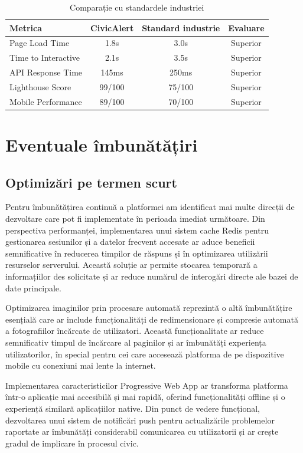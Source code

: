 \documentclass[12pt,a4paper]{report}
\begin{document}
\begin{table}[H]
\centering
\caption{Comparație cu standardele industriei}
\label{tab:industry_benchmark}
\begin{tabular}{|l|c|c|c|}
\hline
\textbf{Metrica} & \textbf{CivicAlert} & \textbf{Standard industrie} & \textbf{Evaluare} \\
\hline
Page Load Time & 1.8s & 3.0s & Superior \\
\hline
Time to Interactive & 2.1s & 3.5s &  Superior \\
\hline
API Response Time & 145ms & 250ms &  Superior \\ 
\hline
Lighthouse Score & 99/100 & 75/100 &  Superior \\
\hline
Mobile Performance & 89/100 & 70/100 &  Superior \\
\hline
\end{tabular}
\end{table}

\section{Eventuale îmbunătățiri}
\subsection{Optimizări pe termen scurt}
Pentru îmbunătățirea continuă a platformei am identificat mai multe direcții de dezvoltare care pot fi implementate în perioada imediat următoare. Din perspectiva performanței, implementarea unui sistem cache Redis pentru gestionarea sesiunilor și a datelor frecvent accesate ar aduce beneficii semnificative în reducerea timpilor de răspuns și în optimizarea utilizării resurselor serverului. Această soluție ar permite stocarea temporară a informațiilor des solicitate și ar reduce numărul de interogări directe ale bazei de date principale.

Optimizarea imaginilor prin procesare automată reprezintă o altă îmbunătățire esențială care ar include funcționalități de redimensionare și compresie automată a fotografiilor încărcate de utilizatori. Această funcționalitate ar reduce semnificativ timpul de încărcare al paginilor și ar îmbunătăți experiența utilizatorilor, în special pentru cei care accesează platforma de pe dispozitive mobile cu conexiuni mai lente la internet.

Implementarea caracteristicilor Progressive Web App ar transforma platforma într-o aplicație mai accesibilă și mai rapidă, oferind funcționalități offline și o experiență similară aplicațiilor native. Din punct de vedere funcțional, dezvoltarea unui sistem de notificări push pentru actualizările problemelor raportate ar îmbunătăți considerabil comunicarea cu utilizatorii și ar crește gradul de implicare în procesul civic.
\end{document}
